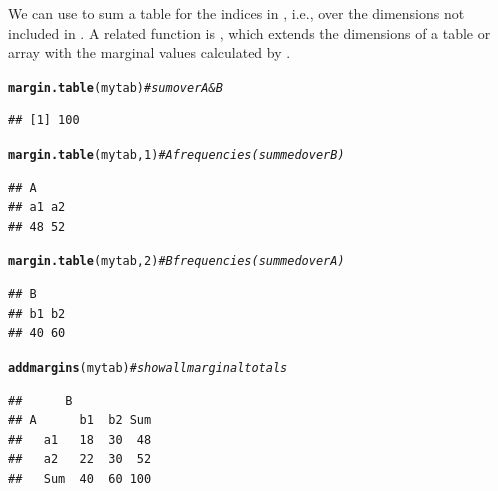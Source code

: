 \documentclass[11pt]{book}\usepackage[]{graphicx}\usepackage[]{color}
\makeatletter
\newcommand{\hlnum}[1]{\textcolor[rgb]{0.686,0.059,0.569}{#1}}%
\newcommand{\hlcom}[1]{\textcolor[rgb]{0.678,0.584,0.686}{\textit{#1}}}%
\newcommand{\hlstd}[1]{\textcolor[rgb]{0.345,0.345,0.345}{#1}}%
\newcommand{\hlkwd}[1]{\textcolor[rgb]{0.737,0.353,0.396}{\textbf{#1}}}%
\newenvironment{kframe}{%
 \def\at@end@of@kframe{}%
 \ifinner\ifhmode%
  \def\at@end@of@kframe{\end{minipage}}%
  \begin{minipage}{\columnwidth}%
 \fi\fi%
 \def\FrameCommand##1{\hskip\@totalleftmargin \hskip-\fboxsep
 \colorbox{shadecolor}{##1}\hskip-\fboxsep
     \hskip-\linewidth \hskip-\@totalleftmargin \hskip\columnwidth}%
 \MakeFramed {\advance\hsize-\width
   \@totalleftmargin\z@ \linewidth\hsize
   \@setminipage}}%
 {\par\unskip\endMakeFramed%
 \at@end@of@kframe}
\newenvironment{knitrout}{}{} %
\renewenvironment{knitrout}{\small\renewcommand{\baselinestretch}{.85}}{} %
\makeatother
\begin{document}
We can use  to sum a table  for
the indices in , i.e., over the dimensions not included
in .
A related function is ,
which extends the dimensions of a table or array with the marginal values calculated
by .

\begin{knitrout}
\color{fgcolor}\begin{kframe}
\begin{alltt}
\hlkwd{margin.table}\hlstd{(mytab)}      \hlcom{# sum over A & B}
\end{alltt}
\begin{verbatim}
## [1] 100
\end{verbatim}
\begin{alltt}
\hlkwd{margin.table}\hlstd{(mytab,} \hlnum{1}\hlstd{)}   \hlcom{# A frequencies (summed over B)}
\end{alltt}
\begin{verbatim}
## A
## a1 a2 
## 48 52
\end{verbatim}
\begin{alltt}
\hlkwd{margin.table}\hlstd{(mytab,} \hlnum{2}\hlstd{)}   \hlcom{# B frequencies (summed over A)}
\end{alltt}
\begin{verbatim}
## B
## b1 b2 
## 40 60
\end{verbatim}
\begin{alltt}
\hlkwd{addmargins}\hlstd{(mytab)}        \hlcom{# show all marginal totals}
\end{alltt}
\begin{verbatim}
##      B
## A      b1  b2 Sum
##   a1   18  30  48
##   a2   22  30  52
##   Sum  40  60 100
\end{verbatim}
\end{kframe}
\end{knitrout}
\end{document}
